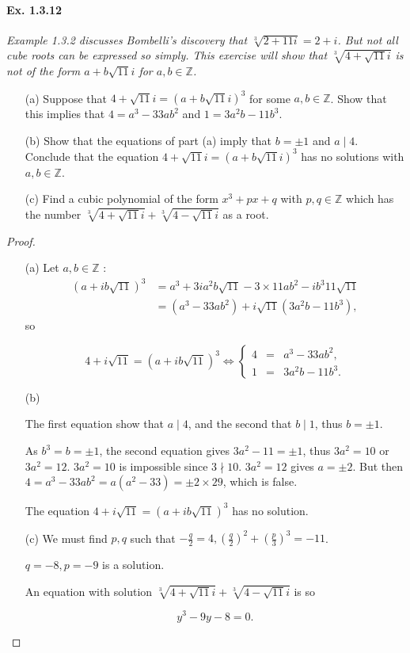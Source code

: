 \documentclass[11pt,a4paper]{article}
\newcommand{\Z}{\mathbb{Z}}
\begin{document}
\paragraph{Ex. 1.3.12}

{\it Example 1.3.2 discusses Bombelli's discovery that $\sqrt[3]{2+11i} = 2+i$. But not all cube roots can be expressed so simply. This exercise will show that $\sqrt[3]{4+\sqrt{11}i}$ is not of the form $a+b\sqrt{11}i$ for $a,b \in \Z$.
\begin{enumerate}
\item[(a)] Suppose that $4 + \sqrt{11}i = (a+ b \sqrt{11}i)^3$ for some $a,b\in \Z$. Show that this implies that $4 = a^3 - 33 ab^2$ and $1 = 3a^2b - 11 b^3$.
\item[(b)] Show that the equations of part (a) imply that $b=\pm1$ and $a\mid 4$. Conclude that the equation $4 + \sqrt{11}i = (a+b \sqrt{11}i)^3$ has no solutions with $a,b\in \Z$.
\item[(c)] Find a cubic polynomial of the form $x^3+px+q$ with $p,q\in \Z$ which has the number $\sqrt[3]{4+\sqrt{11}i} + \sqrt[3]{4-\sqrt{11}i}$ as a root.
\end{enumerate}
}

\begin{proof}
\begin{enumerate}

\item[(a)]  Let $a,b\in \mathbb{Z}$ : 
\begin{align*}
(a+ib\sqrt{11})^3 &= a^3 + 3ia^2 b \sqrt{11} - 3 \times11a b^2 - i b^3 11\sqrt{11}\\
&=(a^3-33ab^2)+i\sqrt{11}(3a^2b-11b^3),
\end{align*}
so

$$4+i\sqrt{11} =(a+ib\sqrt{11})^3 \iff 
\left \{
\begin{array}{ccc}
  4&=   &  a^3-33ab^2,\\
  1& =  &    3a^2b - 11b^3.
\end{array}
\right.
$$

\item[(b)] 

The first equation show that $a \mid 4$, and the second that $b\mid 1$, thus $b = \pm1$.

As $b^3=b=\pm1$, the second equation gives $3a^2-11 = \pm1$, thus $3a^2 = 10$ or $3a^2 = 12$. $3a^2 = 10$ is  impossible since $3 \nmid 10$. $3a^2 = 12$ gives  $a = \pm 2$. But then $4 = a^3 -33 a b^2 = a(a^2-33) = \pm 2 \times 29$, which is false.

The equation $4+i\sqrt{11} =(a+ib\sqrt{11})^3$ has no solution.


\item[(c)] 
We must find $p,q$ such that 
$-\frac{q}{2} = 4,\left(\frac{q}{2}\right)^2 + \left(\frac{p}{3}\right)^3 = -11$.

$q=-8, p = -9$ is a solution.

An equation with solution $\sqrt[3]{4+\sqrt{11}i} + \sqrt[3]{4-\sqrt{11}i}$ is so

$$y^3 -9y-8 = 0.$$
\end{enumerate}
\end{proof}
\end{document}
